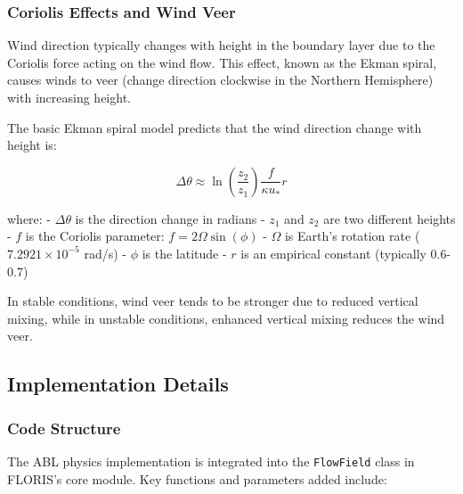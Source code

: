 \documentclass{article}
\begin{document}
\hypertarget{coriolis-effects-and-wind-veer}{%
\subsubsection{Coriolis Effects and Wind
Veer}\label{coriolis-effects-and-wind-veer}}

Wind direction typically changes with height in the boundary layer due
to the Coriolis force acting on the wind flow. This effect, known as the
Ekman spiral, causes winds to veer (change direction clockwise in the
Northern Hemisphere) with increasing height.

The basic Ekman spiral model predicts that the wind direction change
with height is:

\[\Delta\theta \approx \ln\left(\frac{z_2}{z_1}\right) \frac{f}{\kappa u_*} r\]

where: - \(\Delta\theta\) is the direction change in radians - \(z_1\)
and \(z_2\) are two different heights - \(f\) is the Coriolis parameter:
\(f = 2\Omega\sin(\phi)\) - \(\Omega\) is Earth's rotation rate
($7.2921\times10^{-5}$ rad/s) - \(\phi\) is the latitude - \(r\) is an empirical
constant (typically 0.6-0.7)

In stable conditions, wind veer tends to be stronger due to reduced
vertical mixing, while in unstable conditions, enhanced vertical mixing
reduces the wind veer.

\hypertarget{implementation-details}{%
\subsection{Implementation Details}\label{implementation-details}}

\hypertarget{code-structure}{%
\subsubsection{Code Structure}\label{code-structure}}

The ABL physics implementation is integrated into the \texttt{FlowField}
class in FLORIS's core module. Key functions and parameters added
include:
\end{document}
